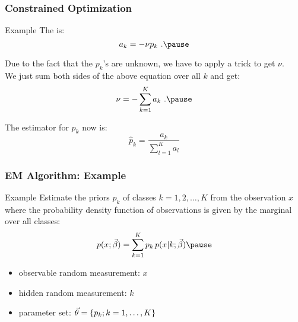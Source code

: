 \begin{frame}
  \frametitle{Constrained Optimization \cont}
  
  \begin{ovalblock}{Example \cont}
    \small
    The  is:
    {\footnotesize
    \begin{displaymath}
      a_k= -\nu p_k~. \pause
    \end{displaymath}
    }
 
    Due to the fact that the $p_k$'s are unknown, we have to apply a trick to get $\nu$. \\
    We just sum both sides of the above equation over all $k$ and get:
    {\footnotesize
      \begin{displaymath}
        \nu = -\sum_{k=1}^K a_k~. \pause
      \end{displaymath}
    }

    The estimator for $p_k$ now is:
    {\footnotesize
      \begin{displaymath}
        \hat{p}_k = \frac{a_k}{\sum_{l=1}^K a_l}
      \end{displaymath}
    }
  \end{ovalblock}
\end{frame}


\begin{frame}
  \frametitle{EM Algorithm: Example}

  \begin{ovalblock}{Example}
    \small
    Estimate the priors $p_k$ of classes $k=1,2, \dots, K$ from the observation $x$ \\
    where the probability density function of observations is given by the marginal over all classes:
    {\footnotesize
    \begin{displaymath}
      p(x;\BiasField) = \sum_{k=1}^K p_k\,p(x|k; \BiasField) \pause
    \end{displaymath}
    }

    \begin{itemize}
      \item observable random measurement: $x$
      \item hidden random measurement: $k$
      \item parameter set: $\vec{\theta} = \{p_k; k=1,\dots, K\}$
    \end{itemize}
  \end{ovalblock}
\end{frame}


